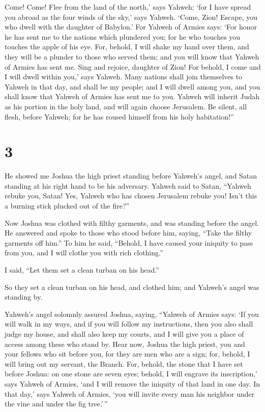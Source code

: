  Come! Come! Flee from the land of the north,' says Yahweh;
`for I have spread you abroad as the four winds of the sky,' says
Yahweh.  `Come, Zion! Escape, you who dwell with the
daughter of Babylon.'  For Yahweh of Armies says: `For honor
he has sent me to the nations which plundered you; for he who touches
you touches the apple of his eye.  For, behold, I will shake
my hand over them, and they will be a plunder to those who served them;
and you will know that Yahweh of Armies has sent me.  Sing
and rejoice, daughter of Zion! For behold, I come and I will dwell
within you,' says Yahweh.  Many nations shall join
themselves to Yahweh in that day, and shall be my people; and I will
dwell among you, and you shall know that Yahweh of Armies has sent me to
you.  Yahweh will inherit Judah as his portion in the holy
land, and will again choose Jerusalem.  Be silent, all
flesh, before Yahweh; for he has roused himself from his holy
habitation!''

\hypertarget{section-2}{%
\section{3}\label{section-2}}

 He showed me Joshua the high priest standing before
Yahweh's angel, and Satan standing at his right hand to be his
adversary.  Yahweh said to Satan, ``Yahweh rebuke you,
Satan! Yes, Yahweh who has chosen Jerusalem rebuke you! Isn't this a
burning stick plucked out of the fire?''

 Now Joshua was clothed with filthy garments, and was
standing before the angel.  He answered and spoke to those
who stood before him, saying, ``Take the filthy garments off him.'' To
him he said, ``Behold, I have caused your iniquity to pass from you, and
I will clothe you with rich clothing.''

 I said, ``Let them set a clean turban on his head.''

So they set a clean turban on his head, and clothed him; and Yahweh's
angel was standing by.

 Yahweh's angel solomnly assured Joshua, saying,
 ``Yahweh of Armies says: `If you will walk in my ways, and
if you will follow my instructions, then you also shall judge my house,
and shall also keep my courts, and I will give you a place of access
among these who stand by.  Hear now, Joshua the high priest,
you and your fellows who sit before you, for they are men who are a
sign; for, behold, I will bring out my servant, the Branch. 
For, behold, the stone that I have set before Joshua: on one stone are
seven eyes; behold, I will engrave its inscription,' says Yahweh of
Armies, `and I will remove the iniquity of that land in one day.
 In that day,' says Yahweh of Armies, `you will invite
every man his neighbor under the vine and under the fig tree.'\,''


